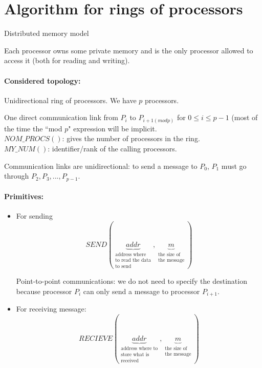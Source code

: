 \section{Algorithm for rings of processors}

Distributed memory model

Each processor owns some private memory and is the only processor allowed to access it (both for reading and writing).

\paragraph{Considered topology:}
Unidirectional ring of processors. We have $p$ processors.


One direct communication link from $P_i$ to $P_{i+1(mod p)}$ for $0\leq i \leq p-1$ (most of the time the ``mod $p$" expression will be implicit.\\
$NOM\_PROCS()$: gives the number of processors in the ring.\\
$MY\_NUM()$: identifier/rank of the calling processors.

Communication links are unidirectional: to send a message to $P_0$, $P_1$ must go through $P_2,P_3,...,P_{p-1}$.

\paragraph{Primitives:}
\begin{itemize}
\item For sending
\[SEND(\underbrace{addr}_{\substack{\text{address where}\\ \text{to read the data}\\ \text{to send}}}, \underbrace{m}_{\substack{\text{the size of} \\ \text{the message}}})\]

Point-to-point communications: we do not need to specify the destination because processor $P_i$ can only send a message to processor $P_{i+1}$.

\item For receiving message:
\[RECIEVE(\underbrace{addr}_{\substack{\text{address where to} \\ \text{store what is}\\ \text{received}}}, \underbrace{m}_{\substack{\text{the size of}\\ \text{the message}}}) \]
\end{itemize}


